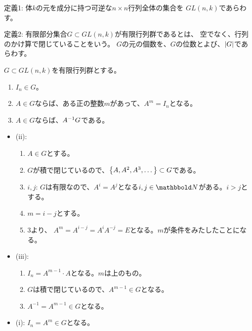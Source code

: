 \begin{framed}
  定義1: 体$k$の元を成分に持つ可逆な$n\times n$行列全体の集合を
  $GL(n,k)$であらわす。
\end{framed}

\begin{framed}
  定義2:
  有限部分集合$G\subset GL(n,k)$が有限行列群であるとは、
  空でなく、行列のかけ算で閉じていることをいう。
  $G$の元の個数を、$G$の位数とよび、$\left|G\right|$であらわす。
\end{framed}

\begin{framed}
  $G\subset GL(n,k)$を有限行列群とする。
  \begin{enumerate}[label=(\roman*)]
    \item $I_n \in G$。
    \item $A\in G$ならば、ある正の整数$m$があって、$A^m = I_n$となる。
    \item $A\in G$ならば、$A^{-1} G$である。
  \end{enumerate}
\end{framed}
\begin{myproof}
  \begin{itemize}
    \item (ii):
    \begin{enumerate}
      \item $A\in G$とする。
      \item $G$が積で閉じているので、$\left\{A,A^2,A^3,\dots\right\}\subset G$である。
      \item $i,j$:
      $G$は有限なので、$A^i = A^j$となる$i,j\in \N$がある。$i > j$とする。
      \item
      $m= i-j$とする。
      \item  3より、
      $A^m = A^{i-j} = A^i A^{-j} = E$となる。$m$が条件をみたしたことになる。
    \end{enumerate}
    \item (iii):
    \begin{enumerate}
      \item $I_n = A^{m-1}\cdot A$となる。$m$は上のもの。
      \item $G$は積で閉じているので、$A^{m-1} \in G$となる。
      \item $A^{-1} = A^{m-1} \in G$となる。
    \end{enumerate}
    \item (i):
    $I_n = A^m \in G$となる。
  \end{itemize}
\end{myproof}

